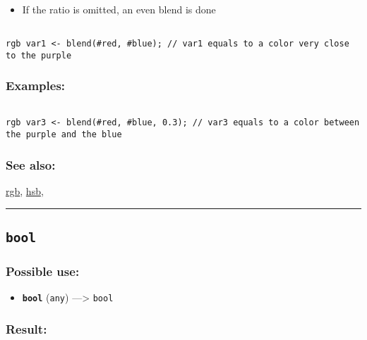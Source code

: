 \documentclass[]{book}
\providecommand{\tightlist}{%
  \setlength{\itemsep}{0pt}\setlength{\parskip}{0pt}}
\theoremstyle{definition}
\theoremstyle{definition}
\theoremstyle{definition}
\theoremstyle{remark}
\begin{document}
\begin{itemize}
\tightlist
\item
  If the ratio is omitted, an even blend is done
\end{itemize}

\begin{verbatim}
 
rgb var1 <- blend(#red, #blue); // var1 equals to a color very close to the purple
\end{verbatim}

\subsubsection{Examples:}\label{examples-57}

\begin{verbatim}
 
rgb var3 <- blend(#red, #blue, 0.3); // var3 equals to a color between the purple and the blue
\end{verbatim}

\subsubsection{See also:}\label{see-also-46}

\href{OperatorsNR\#rgb}{rgb}, \href{OperatorsDH\#hsb}{hsb},

\begin{center}\rule{0.5\linewidth}{\linethickness}\end{center}

\subsection{\texorpdfstring{\texttt{bool}}{bool}}\label{bool}

\subsubsection{Possible use:}\label{possible-use-75}

\begin{itemize}
\tightlist
\item
  \textbf{\texttt{bool}} (\texttt{any}) ---\textgreater{} \texttt{bool}
\end{itemize}

\subsubsection{Result:}\label{result-74}
\end{document}
